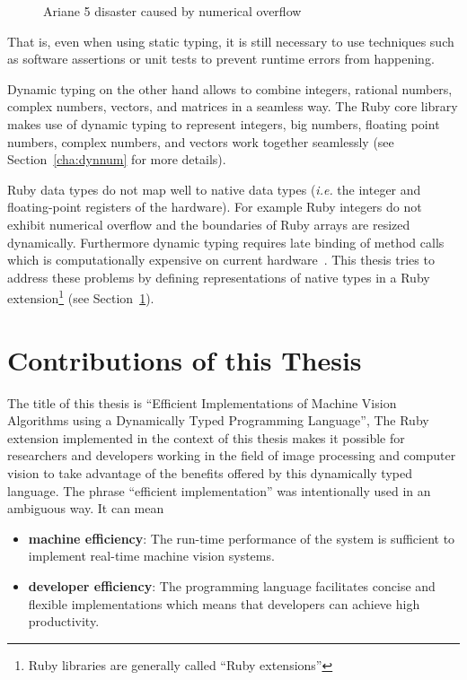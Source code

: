 \documentclass[12pt,a4paper,oneside,openright]{book}
\newcommand{\xtitle}{Efficient Implementations of Machine Vision Algorithms using a Dynamically Typed Programming Language}
\newcommand{\Eg}{For example }
\newcommand{\ie}{\emph{i.e.} }
\newcommand{\Ie}{That is, }
\newcommand{\sct}[1]{Section~\ref{cha:#1}}
\begin{document}
\begin{CJK}{UTF8}{}
\begin{figure}[htbp]
\begin{center}
     \caption{Ariane 5 disaster caused by numerical overflow\label{fig:ariane}}
   \end{center}
\end{figure}
\Ie even when using static typing, it is still necessary to use techniques such as software assertions or unit tests to prevent runtime errors from happening.

Dynamic typing on the other hand allows to combine integers, rational numbers, complex numbers, vectors, and matrices in a seamless way. The Ruby core library makes use of dynamic typing to represent integers, big numbers, floating point numbers, complex numbers, and vectors work together seamlessly (see \sct{dynnum} for more details).

Ruby data types do not map well to native data types (\ie the integer and floating-point registers of the hardware). \Eg Ruby integers do not exhibit numerical overflow and the boundaries of Ruby arrays are resized dynamically. Furthermore dynamic typing requires late binding of method calls which is computationally expensive on current hardware~\citep{RefWorks:484}. This thesis tries to address these problems by defining representations of native types in a Ruby extension\footnote{Ruby libraries are generally called ``Ruby extensions''} (see \sct{contrib}).

\section{Contributions of this Thesis}\label{cha:contrib}
The title of this thesis is ``\xtitle'', The Ruby extension implemented in the context of this thesis makes it possible for researchers and developers working in the field of image processing and computer vision to take advantage of the benefits offered by this dynamically typed language. The phrase ``efficient implementation'' was intentionally used in an ambiguous way. It can mean
\begin{itemize}
\item \textbf{machine efficiency}: The run-time performance of the system is sufficient to implement real-time machine vision systems.
\item \textbf{developer efficiency}: The programming language facilitates concise and flexible implementations which means that developers can achieve high productivity.
\end{itemize}


\end{CJK}
\end{document}
